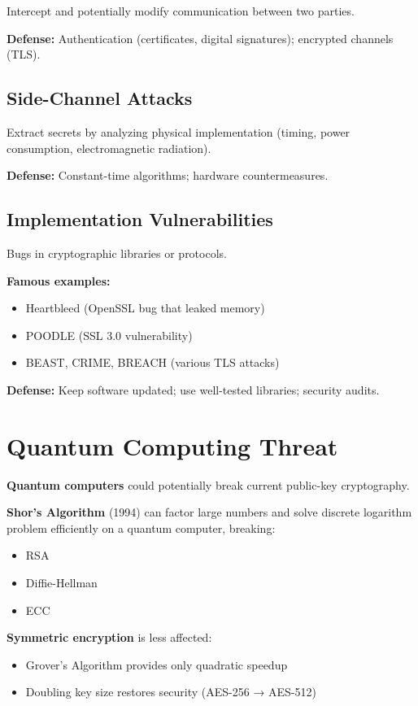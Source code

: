 \documentclass[11pt,a4paper]{report}
\begin{document}
Intercept and potentially modify communication between two parties.

\textbf{Defense:} Authentication (certificates, digital signatures); encrypted channels (TLS).

\subsection{Side-Channel Attacks}

Extract secrets by analyzing physical implementation (timing, power consumption, electromagnetic radiation).

\textbf{Defense:} Constant-time algorithms; hardware countermeasures.

\subsection{Implementation Vulnerabilities}

Bugs in cryptographic libraries or protocols.

\textbf{Famous examples:}
\begin{itemize}
\item Heartbleed (OpenSSL bug that leaked memory)
\item POODLE (SSL 3.0 vulnerability)
\item BEAST, CRIME, BREACH (various TLS attacks)
\end{itemize}

\textbf{Defense:} Keep software updated; use well-tested libraries; security audits.

\section{Quantum Computing Threat}

\textbf{Quantum computers} could potentially break current public-key cryptography.

\textbf{Shor's Algorithm} (1994) can factor large numbers and solve discrete logarithm problem efficiently on a quantum computer, breaking:
\begin{itemize}
\item RSA
\item Diffie-Hellman
\item ECC
\end{itemize}

\textbf{Symmetric encryption} is less affected:
\begin{itemize}
\item Grover's Algorithm provides only quadratic speedup
\item Doubling key size restores security (AES-256 → AES-512)
\end{itemize}
\end{document}
